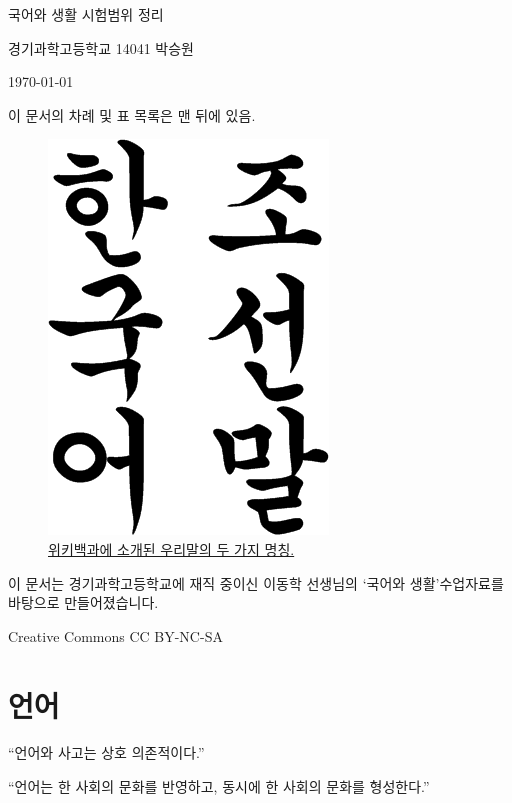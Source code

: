 \documentclass[10pt]{report}
\newcommand{\tl}{\textquoteleft}
\newcommand{\tr}{\textquoteright}
\newcommand{\ttl}{\textquotedblleft}
\newcommand{\ttr}{\textquotedblright}
\begin{document}
\begin{center}
	\Large 국어와 생활 시험범위 정리
	\normalsize
	\begin{flushright}
		경기과학고등학교 14041 박승원
		
		\today
	\end{flushright}
	이 문서의 차례 및 표 목록은 맨 뒤에 있음. \color{blue}{\#시험기간이라서}
	\begin{figure}[h]
		\begin{center}
			\includegraphics{Korean.png}
			\caption{\href{https://en.wikipedia.org/wiki/Korean_language}{위키백과에 소개된 우리말의 두 가지 명칭.}}
		\end{center}
	\end{figure}
\end{center}
이 문서는 경기과학고등학교에 재직 중이신 이동학 선생님의 \tl 국어와 생활\tr  수업자료를 바탕으로 만들어졌습니다.

Creative Commons CC BY-NC-SA


\chapter{언어}
\begin{center}
	\ttl 언어와 사고는 상호 의존적이다.\ttr
	
	\ttl 언어는 한 사회의 문화를 반영하고, 동시에 한 사회의 문화를 형성한다.\ttr
\end{center}
\end{document}
